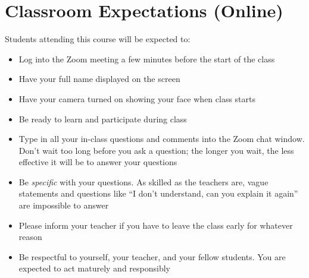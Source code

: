 \documentclass{../../oss-handout}
\begin{document}
\section{Classroom Expectations (Online)}
Students attending this course will be expected to:
\begin{itemize}[nosep]
\item Log into the Zoom meeting a few minutes before the start of the class
\item Have your full name displayed on the screen
\item Have your camera turned on showing your face when class starts
\item Be ready to learn and participate during class
\item Type in all your in-class questions and comments into the Zoom chat
  window. Don't wait too long before you ask a question; the longer you wait,
  the less effective it will be to answer your questions
\item Be \emph{specific} with your questions. As skilled as the teachers are,
  vague statements and questions like ``I don't understand, can you explain it
  again'' are impossible to answer
\item Please inform your teacher if you have to leave the class early for
  whatever reason
\item Be respectful to yourself, your teacher, and your fellow students. You
  are expected to act maturely and responsibly
\end{itemize}
\end{document}

